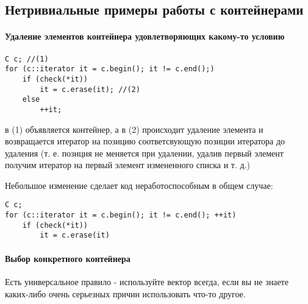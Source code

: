 \subsection{Нетривиальные примеры работы с контейнерами}

\paragraph{Удаление элементов контейнера удовлетворяющих какому-то условию}
\begin{lstlisting}
C c; //(1)
for (c::iterator it = c.begin(); it != c.end();)
	if (check(*it))
		it = c.erase(it); //(2)
	else
		++it;
\end{lstlisting}
в (1) объявляется контейнер, а в (2) происходит удаление элемента и возвращается итератор на позицию соответсвующую позиции итератора до удаления (т. е. позиция не
меняется при удалении, удалив первый элемент получим итератор на первый элемент измененного списка и т. д.)

Небольшое изменение сделает код неработоспособным в общем случае:
\begin{lstlisting}
C c;
for (c::iterator it = c.begin(); it != c.end(); ++it)
	if (check(*it))
		it = c.erase(it)
\end{lstlisting}

\paragraph{Выбор конкретного контейнера} Есть универсальное правило - используйте вектор всегда, если вы не знаете каких-либо очень серьезных причин использовать
что-то другое.